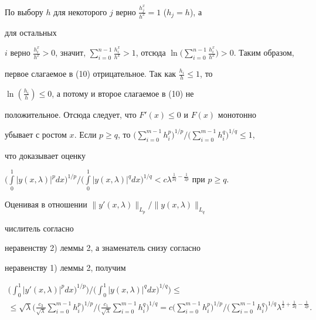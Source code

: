 По выбору $h$ для некоторого $j$ верно $\frac{h^x_j}{h^x}=1$ ($h_j=h$), а 


для остальных 


$i$ верно $\frac{h^x_i}{h^x}>0$, значит, $\sum\limits^{n-1}_{i=0} 


\frac{h^x_i}{h^x}>1$, отсюда $\ln\Big(\sum\limits^{n-1}_{i=0} 


\frac{h^x_i}{h^x}\Big)>0$. Таким образом, 


первое слагаемое в (10) отрицательное. Так как $\frac{h_i}{h}\le1$, то 


$\ln(\frac{h_i}{h})\le0$, а потому и второе слагаемое в (10) не 


положительное. Отсюда следует, что $F'(x)\le0$ и $F(x)$ монотонно 


убывает с ростом $x$. Если $p\ge q$, то $\Big(\sum\limits^{m-1}_{i=0} 


h^p_i\Big)^{1/p}\Big/\Big(\sum\limits^{m-1}_{i=0} h^q_i\Big)^{1/q}\le1$, 


что доказывает оценку 


$\Big(\int\limits^1_0|y(x,\lambda)|^p dx\Big)^{1/p}\Big/ 


\Big(\int\limits^1_0|y(x,\lambda)|^q dx\Big)^{1/q}< 


c\lambda^{\frac{1}{2q}-\frac{1}{2p}}$ при $p\ge q$. 


 


Оценивая в отношении $\|y'(x,\lambda)\|_{L_p}/ \|y(x,\lambda)\|_{L_q}$ 


числитель согласно 


неравенству 2) леммы 2, а знаменатель снизу согласно 


неравенству 1) леммы 2, получим 


\begin{multline*} 


\bigg(\int^1_0|y'(x,\lambda)|^p dx)^{1/p} \bigg)\Big/ 


\bigg(\int^1_0|y(x,\lambda)|^q dx)^{1/q} \bigg)\le \\ \le \sqrt{\lambda} 


\bigg(\frac{c_3}{\sqrt{\lambda}}\sum^{m-1}_{i=0} 


h^p_i\bigg)^{1/p}


\Big/\bigg(\frac{c_1}{\sqrt{\lambda}} 


\sum^{m-1}_{i=0}h^q_i\bigg)^{1/q}=c\bigg( 


\sum^{m-1}_{i=0}h^p_i\bigg)^{1/p}\Big/\bigg( 


\sum^{m-1}_{i=0}h^q_i\bigg)^{1/q} 


\lambda^{\frac{1}{2}+\frac{1}{2q}-\frac{1}{2p}}. 


\end{multline*}  


